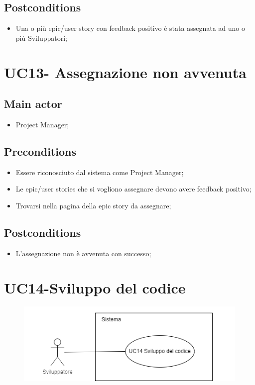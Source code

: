 \documentclass{article}
\begin{document}
    \subsection*{Postconditions}
        \begin{itemize}
            \item Una o più epic/user story con feedback positivo è stata assegnata ad uno o più Sviluppatori;
        \end{itemize}

\section{UC13- Assegnazione non avvenuta}

       \subsection*{Main actor}
    \begin{itemize}
        \item Project Manager;
    \end{itemize}
    
    \subsection*{Preconditions}
        \begin{itemize}
            \item Essere riconosciuto dal sistema come Project Manager;
            \item Le epic/user stories che si vogliono assegnare devono avere feedback positivo;
            \item Trovarsi nella pagina della epic story da assegnare;
        \end{itemize}
        
    \subsection*{Postconditions}
        \begin{itemize}
            \item L'assegnazione non è avvenuta con successo;
        \end{itemize}
    
\section{UC14-Sviluppo del codice}
    \begin{figure}[h]
      \centering
      \includegraphics{documenti/imgUML/UC14.png}
      \label{fig:immagine}
    \end{figure}
    
\end{document}
